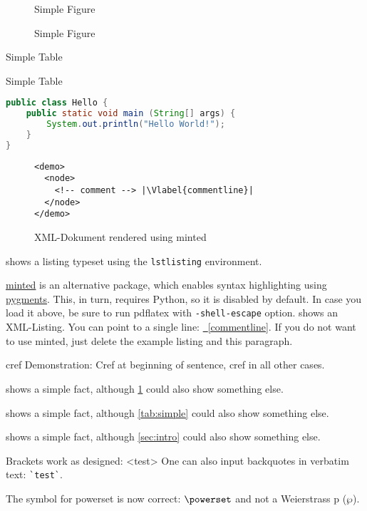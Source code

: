 \documentclass[runningheads,a4paper]{llncs}[2015/06/24]
\newcommand{\Vlabel}[1]{\label[line]{#1}\hypertarget{#1}{}}
\newcommand{\lref}[1]{\hyperlink{#1}{\FancyVerbLineautorefname~\ref*{#1}}}
\newenvironment{listing}[1][htbp!]{\begin{figure}[#1]}{\end{figure}}
\newcounter{listing}
\newenvironment{minted}[1][]{
    \bfseries
    Package minted was not loaded, so there is no XML code shown.

    In case you load minted, please be sure to \begin{enumerate}[a)]
      \item Have \href{https://www.python.org/downloads/}{python} and \href{http://pygments.org/download/}{pygments} installed
      \item Excecute pdflatex using \texttt{-shell-escape}
    \end{enumerate}
  }{}
\begin{document}
\begin{figure}
  Simple Figure
  \caption{Simple Figure}
  \label{fig:simple}
\end{figure}

\begin{table}
  \caption{Simple Table}

  \label{tab:simple}
  Simple Table
\end{table}

\begin{lstlisting}[caption={Example Listing}, label=L1, language=Java]
public class Hello {
    public static void main (String[] args) {
        System.out.println("Hello World!");
    }
}
\end{lstlisting}

\begin{listing}[ht]
  \begin{verbatim}
<demo>
  <node>
    <!-- comment --> |\Vlabel{commentline}|
  </node>
</demo>
\end{verbatim}
  \caption{XML-Dokument rendered using minted}
  \label{lst:xml}
\end{listing}

 shows a listing typeset using the \texttt{lstlisting} environment.

\href{https://github.com/gpoore/minted}{minted} is an alternative package, which enables syntax highlighting using \href{http://pygments.org/}{pygments}.
This, in turn, requires Python, so it is disabled by default.
In case you load it above, be sure to run pdflatex with \texttt{-shell-escape} option.
 shows an XML-Listing.
You can point to a single line: \lref{commentline}.
If you do not want to use minted, just delete the example listing and this paragraph.

cref Demonstration: Cref at beginning of sentence, cref in all other cases.

 shows a simple fact, although \cref{fig:simple} could also show something else.

 shows a simple fact, although \cref{tab:simple} could also show something else.

 shows a simple fact, although \cref{sec:intro} could also show something else.

Brackets work as designed:
<test>
One can also input backquotes in verbatim text: \verb|`test`|.

The symbol for powerset is now correct: $\powerset$ and not a Weierstrass p ($\wp$).
\end{document}
